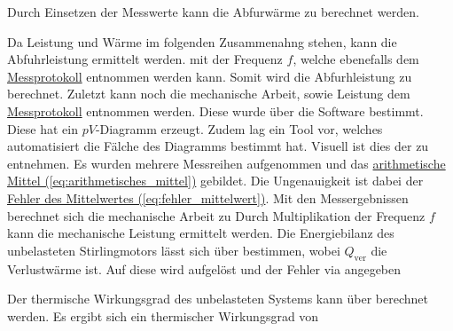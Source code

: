 Durch Einsetzen der Messwerte kann die Abfurwärme zu 
berechnet werden.

Da Leistung und Wärme im folgenden Zusammenahng stehen, kann die Abfuhrleistung ermittelt werden.
mit der Frequenz $f$, welche ebenefalls dem \hyperref[ch:Protokoll]{Messprotokoll} entnommen werden kann. Somit wird die Abfurhleistung zu 
berechnet.
Zuletzt kann noch die mechanische Arbeit, sowie Leistung dem \hyperref[ch:Protokoll]{Messprotokoll} entnommen werden. Diese wurde über die Software bestimmt. Diese hat ein $pV$-Diagramm erzeugt. Zudem lag ein Tool vor, welches automatisiert die Fälche des Diagramms bestimmt hat. Visuell ist dies der  zu entnehmen. Es wurden mehrere Messreihen aufgenommen und das \hyperref[eq:arithmetisches_mittel]{arithmetische Mittel (\ref*{eq:arithmetisches_mittel})} gebildet. 
Die Ungenauigkeit ist dabei der \hyperref[eq:fehler_mittelwert]{Fehler des Mittelwertes (\ref*{eq:fehler_mittelwert})}. Mit den Messergebnissen berechnet sich die mechanische Arbeit zu
Durch Multiplikation der Frequenz $f$ kann die mechanische Leistung
ermittelt werden. Die Energiebilanz des unbelasteten Stirlingmotors lässt sich über
bestimmen, wobei $Q_\text{ver}$ die Verlustwärme ist. Auf diese wird aufgelöst und der Fehler via  angegeben

Der thermische Wirkungsgrad des unbelasteten Systems kann über  
berechnet werden. Es ergibt sich ein thermischer Wirkungsgrad von



